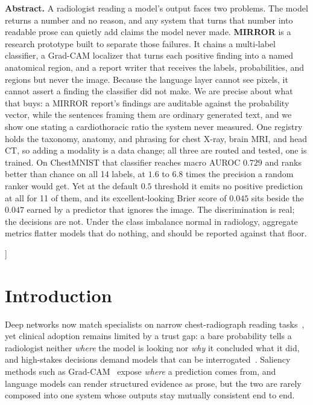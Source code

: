 \documentclass[10pt,twocolumn]{article}
\begin{document}
{\begin{minipage}{0.88\textwidth}
\small
\textbf{Abstract.}
A radiologist reading a model's output faces two problems. The model returns a
number and no reason, and any system that turns that number into readable prose
can quietly add claims the model never made. \textbf{MIRROR} is a research
prototype built to separate those failures. It chains a multi-label classifier, a
Grad-CAM localizer that turns each positive finding into a named anatomical
region, and a report writer that receives the labels, probabilities, and regions
but never the image. Because the language layer cannot see pixels, it cannot
assert a finding the classifier did not make. We are precise about what that buys:
a MIRROR report's findings are auditable against the probability vector, while the
sentences framing them are ordinary generated text, and we show one stating a
cardiothoracic ratio the system never measured. One registry holds the taxonomy,
anatomy, and phrasing for chest X-ray, brain MRI, and head CT, so adding a
modality is a data change; all three are routed and tested, one is trained. On
ChestMNIST that classifier reaches macro
AUROC $0.729$ and ranks better than chance on all 14 labels, at $1.6$ to $6.8$
times the precision a random ranker would get. Yet at the default $0.5$ threshold
it emits no positive prediction at all for 11 of them, and its excellent-looking
Brier score of $0.045$ sits beside the $0.047$ earned by a predictor that ignores
the image. The discrimination is real; the decisions are not. Under the class
imbalance normal in radiology, aggregate metrics flatter models that do nothing,
and should be reported against that floor.
\end{minipage}
\vspace{10pt}
}]

\section{Introduction}

Deep networks now match specialists on narrow chest-radiograph reading
tasks~\cite{rajpurkar2017chexnet}, yet clinical adoption remains limited by a
trust gap: a bare probability tells a radiologist neither \emph{where} the model
is looking nor \emph{why} it concluded what it did, and high-stakes decisions
demand models that can be interrogated~\cite{rudin2019stop}. Saliency methods such
as Grad-CAM~\cite{selvaraju2017gradcam} expose \emph{where} a prediction comes
from, and language models can render structured evidence as prose, but the two are
rarely composed into one system whose outputs stay mutually consistent end to end.
\end{document}
